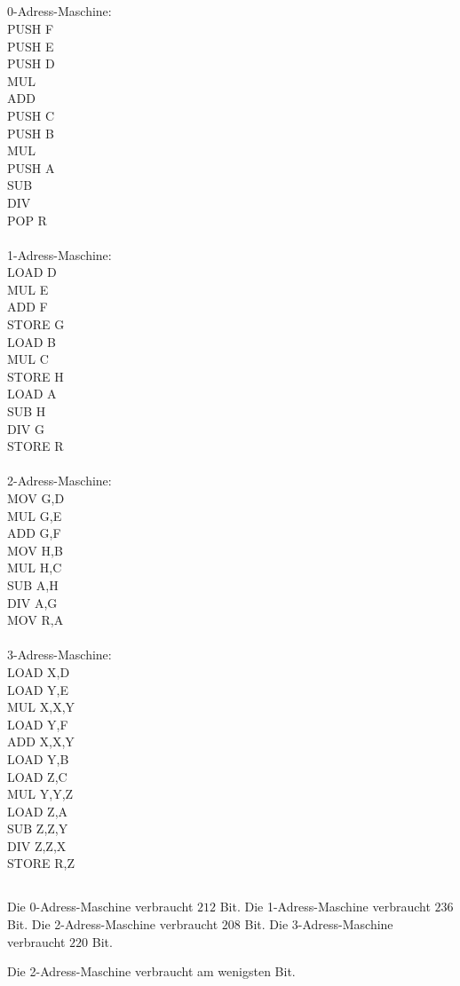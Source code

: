\documentclass[10pt,a4paper,oneside,ngerman,numbers=noenddot]{scrartcl}
\begin{document}
\subsection{} %
0-Adress-Maschine:\\
PUSH F\\
PUSH E\\
PUSH D\\
MUL\\
ADD\\
PUSH C\\
PUSH B\\
MUL\\
PUSH A\\
SUB\\
DIV\\
POP R\\
\\
1-Adress-Maschine:\\
LOAD D\\
MUL E\\
ADD F\\
STORE G\\
LOAD B\\
MUL C\\
STORE H\\
LOAD A\\
SUB H\\
DIV G\\
STORE R\\
\\
2-Adress-Maschine:\\
MOV G,D\\
MUL G,E\\
ADD G,F\\
MOV H,B\\
MUL H,C\\
SUB A,H\\
DIV A,G\\
MOV R,A\\
\\
3-Adress-Maschine:\\
LOAD X,D\\
LOAD Y,E\\
MUL X,X,Y\\
LOAD Y,F\\
ADD X,X,Y\\
LOAD Y,B\\
LOAD Z,C\\
MUL Y,Y,Z\\
LOAD Z,A\\
SUB Z,Z,Y\\
DIV Z,Z,X\\
STORE R,Z\\
\subsection{} %
Die 0-Adress-Maschine verbraucht $212$ Bit. Die 1-Adress-Maschine verbraucht $236$ Bit. Die 2-Adress-Maschine verbraucht $208$ Bit. Die 3-Adress-Maschine verbraucht $220$ Bit.

Die 2-Adress-Maschine verbraucht am wenigsten Bit.
\end{document}
